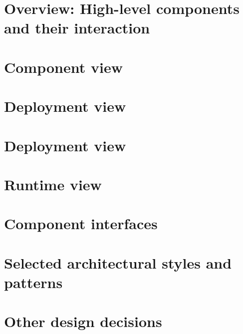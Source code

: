 \section{Overview: High-level components and their interaction}
\label{s:overview}%

\section{Component view}
\label{s:component-view}%

\section{Deployment view}
\label{s:deployment-view}%


\section{Deployment view}
\label{s:deployment-view}%

\section{Runtime view}
\label{s:runtime-view}%

\section{Component interfaces}
\label{s:component-interfaces}%

\section{Selected architectural styles and patterns}
\label{s:selected-architectural-styles-and-patterns}%

\section{Other design decisions}
\label{s:other-design-decisions}%
